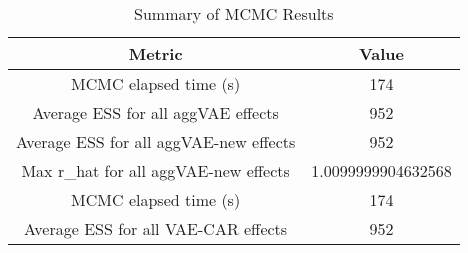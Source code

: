 
\begin{table}[h!]
\centering
\begin{tabular}{|c|c|}
\hline
\textbf{Metric} & \textbf{Value} \\
\hline
MCMC elapsed time (s) & 174 \\
\hline
Average ESS for all aggVAE effects & 952 \\
\hline
Average ESS for all aggVAE-new effects & 952 \\
\hline
Max r\_hat for all aggVAE-new effects & 1.0099999904632568 \\
\hline
MCMC elapsed time (s) & 174 \\
\hline
Average ESS for all VAE-CAR effects & 952 \\
\hline
\end{tabular}
\caption{Summary of MCMC Results}
\label{table:mcmc_summary}
\end{table}
